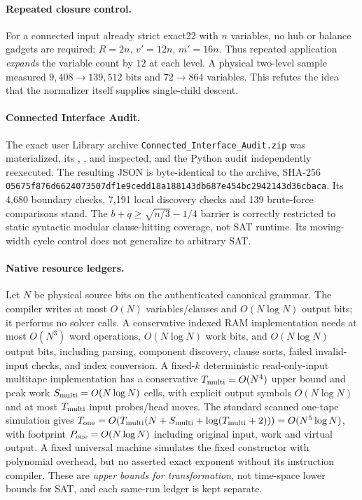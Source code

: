\documentclass[11pt]{article}
\begin{document}
\paragraph{Repeated closure control.} For a connected input already strict exact22 with $n$ variables, no hub or balance gadgets are required: $R=2n$, $v'=12n$, $m'=16n$. Thus repeated application \emph{expands} the variable count by $12$ at each level. A physical two-level sample measured $9,408\to139,512$ bits and $72\to864$ variables. This refutes the idea that the normalizer itself supplies single-child descent.

\paragraph{Connected Interface Audit.} The exact user Library archive \texttt{Connected\_Interface\_Audit.zip} was materialized, its , , and  inspected, and the Python audit independently reexecuted. The resulting JSON is byte-identical to the archive, SHA-256 \texttt{05675f876d6624073507df1e9cedd18a188143db687e454bc2942143d36cbaca}. Its 4,680 boundary checks, 7,191 local discovery checks and 139 brute-force comparisons stand. The $b+q\ge\sqrt{n/3}-1/4$ barrier is correctly restricted to static syntactic modular clause-hitting coverage, not SAT runtime. Its moving-width cycle control does not generalize to arbitrary SAT.

\paragraph{Native resource ledgers.} Let $N$ be physical source bits on the authenticated canonical grammar. The compiler writes at most $O(N)$ variables/clauses and $O(N\log N)$ output bits; it performs no solver calls. A conservative indexed RAM implementation needs at most $O(N^3)$ word operations, $O(N\log N)$ work bits, and $O(N\log N)$ output bits, including parsing, component discovery, clause sorts, failed invalid-input checks, and index conversion. A fixed-$k$ deterministic read-only-input multitape implementation has a conservative $T_{\rm multi}=O(N^4)$ upper bound and peak work $S_{\rm multi}=O(N\log N)$ cells, with explicit output symbols $O(N\log N)$ and at most $T_{\rm multi}$ input probes/head moves. The standard scanned one-tape simulation gives $T_{\rm one}=O(T_{\rm multi}(N+S_{\rm multi}+\log(T_{\rm multi}+2)))=O(N^5\log N)$, with footprint $P_{\rm one}=O(N\log N)$ including original input, work and virtual output. A fixed universal machine simulates the fixed constructor with polynomial overhead, but no asserted exact exponent without its instruction compiler. These are \emph{upper bounds for transformation}, not time-space lower bounds for SAT, and each same-run ledger is kept separate.
\end{document}
